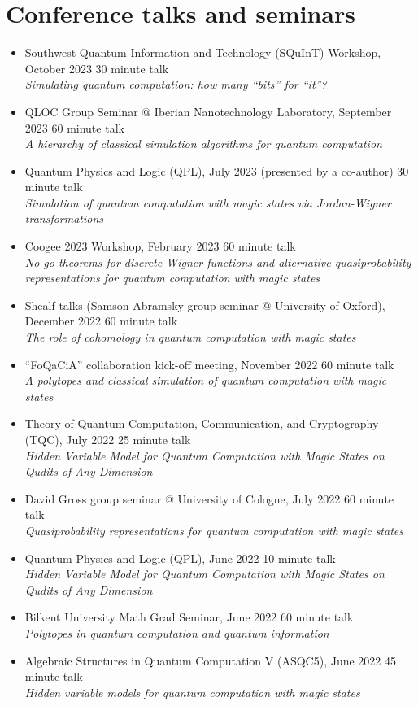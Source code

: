 \documentclass[letterpaper,11pt]{article}
\newcommand{\ConferenceItem}[3]{
	\item{\parbox{0.97\textwidth}{
		{#1}  \hfill {#2}\\
		\emph{#3}
	}}
}
\begin{document}
\section*{Conference talks and seminars}
\begin{itemize}[leftmargin=*]
	\ConferenceItem{Southwest Quantum Information and Technology (SQuInT) Workshop, October 2023}{30 minute talk}{Simulating quantum computation: how many ``bits'' for ``it''?}
	
	\ConferenceItem{QLOC Group Seminar @ Iberian Nanotechnology Laboratory, September 2023}{60 minute talk}{A hierarchy of classical simulation algorithms for quantum computation}
	
	\ConferenceItem{Quantum Physics and Logic (QPL), July 2023 (presented by a co-author)}{30 minute talk}{Simulation of quantum computation with magic states via Jordan-Wigner transformations}
	
	\ConferenceItem{Coogee 2023 Workshop, February 2023}{60 minute talk}{No-go theorems for discrete Wigner functions and alternative quasiprobability representations for quantum computation with magic states}
	
	\ConferenceItem{Shealf talks (Samson Abramsky group seminar @ University of Oxford), December 2022}{60 minute talk}{The role of cohomology in quantum computation with magic states}
	
	\ConferenceItem{``FoQaCiA'' collaboration kick-off meeting, November 2022}{60 minute talk}{$\Lambda$ polytopes and classical simulation of quantum computation with magic states}
	
	\ConferenceItem{Theory of Quantum Computation, Communication, and Cryptography (TQC), July 2022}{25 minute talk}{Hidden Variable Model for Quantum Computation with Magic States on Qudits of Any Dimension}
	
	\ConferenceItem{David Gross group seminar @ University of Cologne, July 2022}{60 minute talk}{Quasiprobability representations for quantum computation with magic states}
	
	\ConferenceItem{Quantum Physics and Logic (QPL), June 2022}{10 minute talk}{Hidden Variable Model for Quantum Computation with Magic States on Qudits of Any Dimension}
	
	\ConferenceItem{Bilkent University Math Grad Seminar, June 2022}{60 minute talk}{Polytopes in quantum computation and quantum information}
	
	\ConferenceItem{Algebraic Structures in Quantum Computation V (ASQC5), June 2022}{45 minute talk}{Hidden variable models for quantum computation with magic states}
	

\end{itemize}
\end{document}
